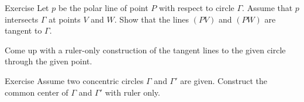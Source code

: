 \begin{thm}{Exercise}\label{ex:tangent ruler}
Let $p$ be the polar line of point $P$ with respect to circle $\Gamma$.
Assume that $p$ intersects $\Gamma$ at points $V$ and $W$.
Show that the lines $(PV)$ and $(PW)$ are tangent to $\Gamma$.

Come up with a ruler-only construction of the tangent lines to the given circle through the given point.
\end{thm}

\begin{thm}{Exercise}\label{ex:concentric-circ}
Assume two concentric circles $\Gamma$ and $\Gamma'$ are given.
Construct the common center of $\Gamma$ and $\Gamma'$ with ruler only.
\end{thm}

